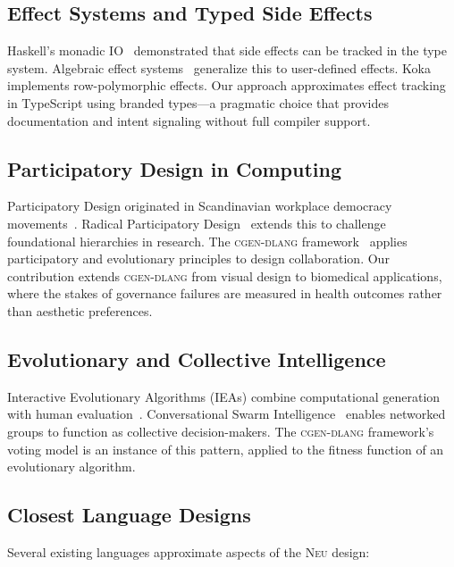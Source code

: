 \documentclass[11pt,letterpaper]{article}
\newcommand{\neu}{\textsc{Neu}}
\newcommand{\cgen}{\textsc{cgen-dlang}}
\begin{document}
\subsection{Effect Systems and Typed Side Effects}

Haskell's monadic IO~\cite{peyton2003} demonstrated that side effects can be tracked in the type system. Algebraic effect systems~\cite{plotkin2009} generalize this to user-defined effects. Koka~\cite{leijen2014} implements row-polymorphic effects. Our approach approximates effect tracking in TypeScript using branded types---a pragmatic choice that provides documentation and intent signaling without full compiler support.

\subsection{Participatory Design in Computing}

Participatory Design originated in Scandinavian workplace democracy movements~\cite{schuler1993}. Radical Participatory Design~\cite{udoewa2022} extends this to challenge foundational hierarchies in research. The \cgen{} framework~\cite{cgen2020} applies participatory and evolutionary principles to design collaboration. Our contribution extends \cgen{} from visual design to biomedical applications, where the stakes of governance failures are measured in health outcomes rather than aesthetic preferences.

\subsection{Evolutionary and Collective Intelligence}

Interactive Evolutionary Algorithms (IEAs) combine computational generation with human evaluation~\cite{he2025}. Conversational Swarm Intelligence~\cite{rosenberg2023} enables networked groups to function as collective decision-makers. The \cgen{} framework's voting model is an instance of this pattern, applied to the fitness function of an evolutionary algorithm.

\subsection{Closest Language Designs}

Several existing languages approximate aspects of the \neu{} design:
\end{document}
